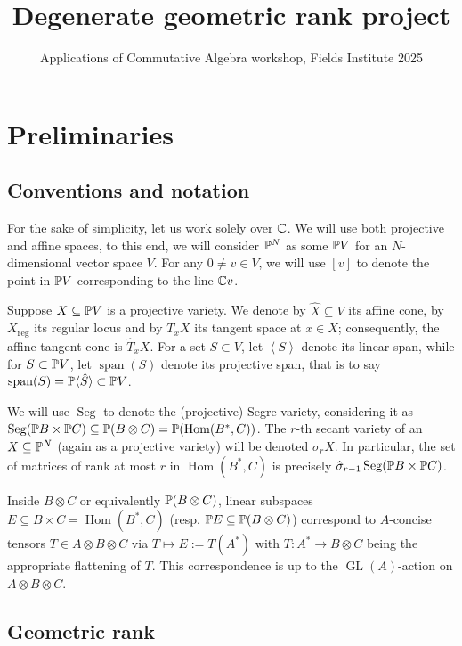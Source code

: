 \documentclass[a4paper,10pt]{article}
\title{Degenerate geometric rank project}
\author{Applications of Commutative Algebra workshop, Fields Institute 2025}
\date{}
\def\reg{\text{reg}}
\def\gener#1{\left\langle#1\right\rangle}
\DeclareMathOperator{\Hom}{Hom}\let\hom\Hom
\DeclareMathOperator{\Seg}{Seg}
\DeclareMathOperator{\GL}{GL}
\DeclareMathOperator{\spn}{span}
\def\uv#1{``#1''}
\theoremstyle{definition}
\theoremstyle{remark}
\begin{document}
\maketitle

\setcounter{section}{-1}
\section{Preliminaries}

\subsection{Conventions and notation}
For the sake of simplicity, let us work solely over $\ce$.
We will use both projective and affine spaces, to this end, we will consider $\pe^N$ as some $\pe V$ for an $N$-dimensional vector space $V$. For any $0\neq v\in V$, we will use $[v]$ to denote the point in $\pe V$ corresponding to the line $\ce v$.

Suppose $X\subseteq\pe V$ is a projective variety. We denote by $\hat X\subseteq V$ its affine cone, by $X_\reg$ its regular locus and by $T_xX$ its tangent space at $x\in X$; consequently, the affine tangent cone is $\hat T_x X$. For a set $S\subset V$, let $\gener S$ denote its linear span, while for $S\subset \pe V$, let $\spn(S)$ denote its projective span, that is to say $\spn(S)=\pe \langle\hat S\rangle\subset \pe V$.

We will use $\Seg$ to denote the (projective) Segre variety, considering it as $\Seg(\pe B\times\pe C)\subseteq  \pe(B\otimes C)= \pe(\Hom(B^*, C))$. The $r$-th secant variety of an $X\subseteq\pe^N$ (again as a projective variety) will be denoted $\sigma_r X$. In particular, the set of matrices of rank at most $r$ in $\Hom(B^*,C)$ is precisely $\hat\sigma_{r-1}\Seg(\pe B\times\pe C)$.

Inside $B\otimes C$ or equivalently $\pe(B\otimes C)$, linear subspaces $E\subseteq B\times C = \Hom(B^*, C)$ (resp. $\pe E\subseteq \pe(B\otimes C)$) correspond to $A$-concise tensors $T\in A\otimes B\otimes C$ via $T\mapsto E:=T(A^*)$ with $T:A^*\to B\otimes C$ being the appropriate flattening of $T$. This correspondence is up to the $\GL(A)$-action on $A\otimes B\otimes C$.

\subsection{Geometric rank}

\end{document}
